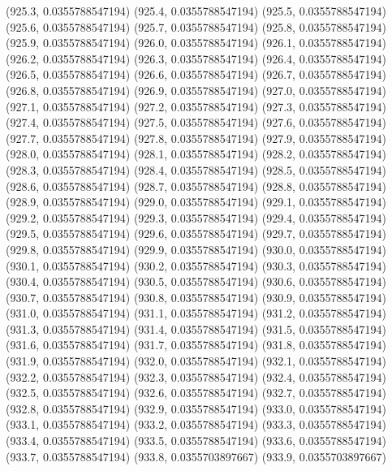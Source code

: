 {					(925.3, 0.0355788547194)
					(925.4, 0.0355788547194)
					(925.5, 0.0355788547194)
					(925.6, 0.0355788547194)
					(925.7, 0.0355788547194)
					(925.8, 0.0355788547194)
					(925.9, 0.0355788547194)
					(926.0, 0.0355788547194)
					(926.1, 0.0355788547194)
					(926.2, 0.0355788547194)
					(926.3, 0.0355788547194)
					(926.4, 0.0355788547194)
					(926.5, 0.0355788547194)
					(926.6, 0.0355788547194)
					(926.7, 0.0355788547194)
					(926.8, 0.0355788547194)
					(926.9, 0.0355788547194)
					(927.0, 0.0355788547194)
					(927.1, 0.0355788547194)
					(927.2, 0.0355788547194)
					(927.3, 0.0355788547194)
					(927.4, 0.0355788547194)
					(927.5, 0.0355788547194)
					(927.6, 0.0355788547194)
					(927.7, 0.0355788547194)
					(927.8, 0.0355788547194)
					(927.9, 0.0355788547194)
					(928.0, 0.0355788547194)
					(928.1, 0.0355788547194)
					(928.2, 0.0355788547194)
					(928.3, 0.0355788547194)
					(928.4, 0.0355788547194)
					(928.5, 0.0355788547194)
					(928.6, 0.0355788547194)
					(928.7, 0.0355788547194)
					(928.8, 0.0355788547194)
					(928.9, 0.0355788547194)
					(929.0, 0.0355788547194)
					(929.1, 0.0355788547194)
					(929.2, 0.0355788547194)
					(929.3, 0.0355788547194)
					(929.4, 0.0355788547194)
					(929.5, 0.0355788547194)
					(929.6, 0.0355788547194)
					(929.7, 0.0355788547194)
					(929.8, 0.0355788547194)
					(929.9, 0.0355788547194)
					(930.0, 0.0355788547194)
					(930.1, 0.0355788547194)
					(930.2, 0.0355788547194)
					(930.3, 0.0355788547194)
					(930.4, 0.0355788547194)
					(930.5, 0.0355788547194)
					(930.6, 0.0355788547194)
					(930.7, 0.0355788547194)
					(930.8, 0.0355788547194)
					(930.9, 0.0355788547194)
					(931.0, 0.0355788547194)
					(931.1, 0.0355788547194)
					(931.2, 0.0355788547194)
					(931.3, 0.0355788547194)
					(931.4, 0.0355788547194)
					(931.5, 0.0355788547194)
					(931.6, 0.0355788547194)
					(931.7, 0.0355788547194)
					(931.8, 0.0355788547194)
					(931.9, 0.0355788547194)
					(932.0, 0.0355788547194)
					(932.1, 0.0355788547194)
					(932.2, 0.0355788547194)
					(932.3, 0.0355788547194)
					(932.4, 0.0355788547194)
					(932.5, 0.0355788547194)
					(932.6, 0.0355788547194)
					(932.7, 0.0355788547194)
					(932.8, 0.0355788547194)
					(932.9, 0.0355788547194)
					(933.0, 0.0355788547194)
					(933.1, 0.0355788547194)
					(933.2, 0.0355788547194)
					(933.3, 0.0355788547194)
					(933.4, 0.0355788547194)
					(933.5, 0.0355788547194)
					(933.6, 0.0355788547194)
					(933.7, 0.0355788547194)
					(933.8, 0.0355703897667)
					(933.9, 0.0355703897667)
}
